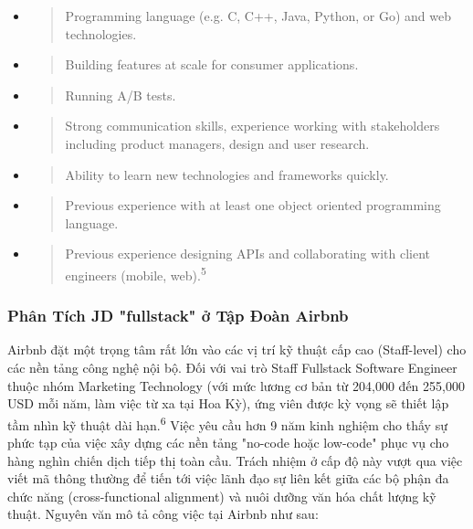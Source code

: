 \documentclass[12pt,a4paper]{article}
\begin{document}
\begin{itemize}
\item
  \begin{quote}
  Programming language (e.g. C, C++, Java, Python, or Go) and web technologies.
  \end{quote}
\item
  \begin{quote}
  Building features at scale for consumer applications.
  \end{quote}
\item
  \begin{quote}
  Running A/B tests.
  \end{quote}
\item
  \begin{quote}
  Strong communication skills, experience working with stakeholders including product managers, design and user research.
  \end{quote}
\item
  \begin{quote}
  Ability to learn new technologies and frameworks quickly.
  \end{quote}
\item
  \begin{quote}
  Previous experience with at least one object oriented programming language.
  \end{quote}
\item
  \begin{quote}
  Previous experience designing APIs and collaborating with client engineers (mobile, web).\textsuperscript{5}
  \end{quote}
\end{itemize}

\subsubsection{Phân Tích JD "fullstack" ở Tập Đoàn Airbnb}

Airbnb đặt một trọng tâm rất lớn vào các vị trí kỹ thuật cấp cao (Staff-level) cho các nền tảng công nghệ nội bộ. Đối với vai trò Staff Fullstack Software Engineer thuộc nhóm Marketing Technology (với mức lương cơ bản từ 204,000 đến 255,000 USD mỗi năm, làm việc từ xa tại Hoa Kỳ), ứng viên được kỳ vọng sẽ thiết lập tầm nhìn kỹ thuật dài hạn.\textsuperscript{6} Việc yêu cầu hơn 9 năm kinh nghiệm cho thấy sự phức tạp của việc xây dựng các nền tảng "no-code hoặc low-code" phục vụ cho hàng nghìn chiến dịch tiếp thị toàn cầu. Trách nhiệm ở cấp độ này vượt qua việc viết mã thông thường để tiến tới việc lãnh đạo sự liên kết giữa các bộ phận đa chức năng (cross-functional alignment) và nuôi dưỡng văn hóa chất lượng kỹ thuật. Nguyên văn mô tả công việc tại Airbnb như sau:
\end{document}
